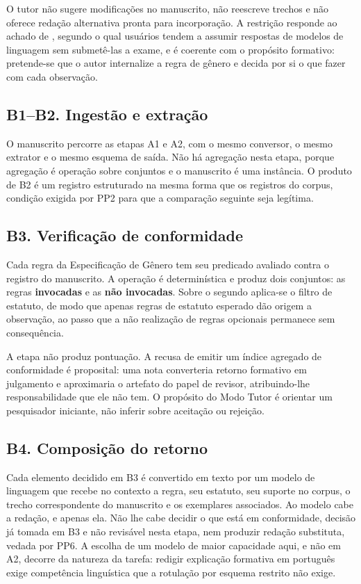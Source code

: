 O tutor não sugere modificações no manuscrito, não reescreve trechos e não oferece redação alternativa pronta para incorporação. A restrição responde ao achado de , segundo o qual usuários tendem a assumir respostas de modelos de linguagem sem submetê-las a exame, e é coerente com o propósito formativo: pretende-se que o autor internalize a regra de gênero e decida por si o que fazer com cada observação.

\subsection*{B1--B2. Ingestão e extração}

O manuscrito percorre as etapas A1 e A2, com o mesmo conversor, o mesmo extrator e o mesmo esquema de saída. Não há agregação nesta etapa, porque agregação é operação sobre conjuntos e o manuscrito é uma instância. O produto de B2 é um registro estruturado na mesma forma que os registros do corpus, condição exigida por PP2 para que a comparação seguinte seja legítima.

\subsection*{B3. Verificação de conformidade}

Cada regra da Especificação de Gênero tem seu predicado avaliado contra o registro do manuscrito. A operação é determinística e produz dois conjuntos: as regras \textbf{invocadas} e as \textbf{não invocadas}. Sobre o segundo aplica-se o filtro de estatuto, de modo que apenas regras de estatuto esperado dão origem a observação, ao passo que a não realização de regras opcionais permanece sem consequência.

A etapa não produz pontuação. A recusa de emitir um índice agregado de conformidade é proposital: uma nota converteria retorno formativo em julgamento e aproximaria o artefato do papel de revisor, atribuindo-lhe responsabilidade que ele não tem. O propósito do Modo Tutor é orientar um pesquisador iniciante, não inferir sobre aceitação ou rejeição.

\subsection*{B4. Composição do retorno}

Cada elemento decidido em B3 é convertido em texto por um modelo de linguagem que recebe no contexto a regra, seu estatuto, seu suporte no corpus, o trecho correspondente do manuscrito e os exemplares associados. Ao modelo cabe a redação, e apenas ela. Não lhe cabe decidir o que está em conformidade, decisão já tomada em B3 e não revisável nesta etapa, nem produzir redação substituta, vedada por PP6. A escolha de um modelo de maior capacidade aqui, e não em A2, decorre da natureza da tarefa: redigir explicação formativa em português exige competência linguística que a rotulação por esquema restrito não exige.


